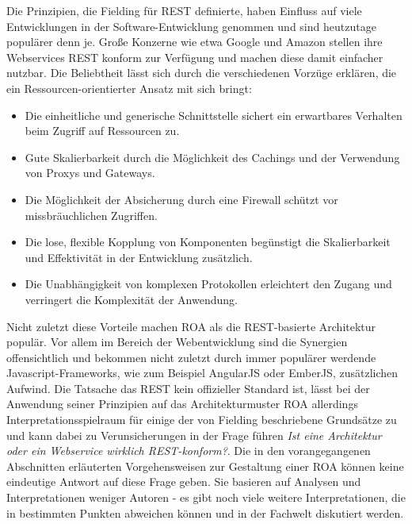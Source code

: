 Die Prinzipien, die Fielding für \ac{REST} definierte, haben Einfluss auf viele Entwicklungen in der Software-Entwicklung genommen und sind heutzutage populärer denn je. Große Konzerne wie etwa Google und Amazon stellen ihre Webservices REST konform zur Verfügung und machen diese damit einfacher nutzbar. Die Beliebtheit lässt sich durch die verschiedenen Vorzüge erklären, die ein Ressourcen-orientierter Ansatz mit sich bringt:
\begin{itemize} 
\item Die einheitliche und generische Schnittstelle sichert ein erwartbares Verhalten beim Zugriff auf Ressourcen zu.
\item Gute Skalierbarkeit durch die Möglichkeit des Cachings und der Verwendung von Proxys und Gateways.
\item Die Möglichkeit der Absicherung durch eine Firewall schützt vor missbräuchlichen Zugriffen.
\item Die lose, flexible Kopplung von Komponenten begünstigt die Skalierbarkeit und Effektivität in der Entwicklung zusätzlich.
\item Die Unabhängigkeit von komplexen Protokollen erleichtert den Zugang und verringert die Komplexität der Anwendung.
\end{itemize}
Nicht zuletzt diese Vorteile machen \ac{ROA} als \glqq{}die REST-basierte Architektur\grqq{} populär. Vor allem im Bereich der Webentwicklung sind die Synergien offensichtlich und bekommen nicht zuletzt durch immer populärer werdende Javascript-Frameworks, wie zum Beispiel AngularJS oder EmberJS, zusätzlichen Aufwind. Die Tatsache das REST kein offizieller Standard ist, lässt bei der Anwendung seiner Prinzipien auf das Architekturmuster \ac{ROA} allerdings Interpretationsspielraum für einige der von Fielding beschriebene Grundsätze zu und kann dabei zu Verunsicherungen in der Frage führen \emph{\glqq{}Ist eine Architektur oder ein Webservice wirklich REST-konform?\grqq{}}. Die in den vorangegangenen Abschnitten erläuterten Vorgehensweisen zur Gestaltung einer \ac{ROA} können keine eindeutige Antwort auf diese Frage geben. Sie basieren auf Analysen und Interpretationen weniger Autoren - es gibt noch viele weitere Interpretationen, die in bestimmten Punkten abweichen können und in der Fachwelt diskutiert werden.

